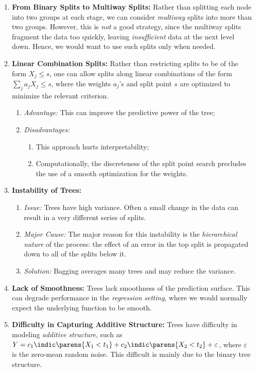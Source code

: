 \documentclass[12pt]{article}
\begin{document}
\begin{enumerate}[label=\textbf{\arabic*.}]
\begin{enumerate}
	\end{enumerate}
	
	\item \textbf{From Binary Splits to Multiway Splits:} Rather than splitting each node into two groups at each stage, we can consider \textit{multiway} splits into more than two groups. However, this is \emph{not} a good strategy, since the multiway splits fragment the data too quickly, leaving \emph{insufficient} data at the next level down. Hence, we would want to use such splits only when needed. 
	
	\item \textbf{Linear Combination Splits:} Rather than restricting splits to be of the form $X_j \le s$, one can allow splits along linear combinations of the form $\sum_{j} a_j X_j \le s$, where the weights $a_j$'s and split point $s$ are optimized to minimize the relevant criterion. 
	\begin{enumerate}
		\item \textit{Advantage:} This can improve the predictive power of the tree; 
		\item \textit{Disadvantages:} 
		\begin{enumerate}
			\item This approach hurts interpretability; 
			\item Computationally, the discreteness of the split point search precludes the use of a smooth optimization for the weights. 
		\end{enumerate}
	\end{enumerate}
	
	\item \textbf{Instability of Trees:} 
	\begin{enumerate}
		\item \textit{Issue:} Trees have high variance. Often a small change in the data can result in a very different series of splits. 
		\item \textit{Major Cause:} The major reason for this instability is the \emph{hierarchical nature} of the process: the effect of an error in the top split is propagated down to all of the splits below it. 
		\item \textit{Solution:} Bagging averages many trees and may reduce the variance. 
	\end{enumerate}
	
	\item \textbf{Lack of Smoothness:} Trees lack smoothness of the prediction surface. This can degrade performance in the \textit{regression setting}, where we would normally expect the underlying function to be smooth. 
	
	\item \textbf{Difficulty in Capturing Additive Structure:} Trees have difficulty in modeling \textit{additive structure}, such as $Y = c_1 \indic \parens{X_1 < t_1} + c_2 \indic \parens{X_2 < t_2} + \varepsilon$, where $\varepsilon$ is the zero-mean random noise. This difficult is mainly due to the binary tree structure. 
	
\end{enumerate}
\end{document}
